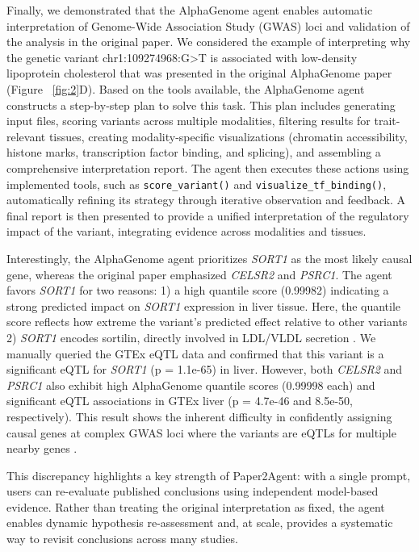 \documentclass[11pt]{article}
\begin{document}
Finally, we demonstrated that the AlphaGenome agent enables automatic interpretation of Genome-Wide Association Study (GWAS) loci and validation of the analysis in the original paper. We considered the example of interpreting why the genetic variant chr1:109274968:G>T is associated with low-density lipoprotein cholesterol that was presented in the original AlphaGenome paper (Figure ~\ref{fig:2}D). Based on the tools available, the AlphaGenome agent constructs a step-by-step plan to solve this task. This plan includes generating input files, scoring variants across multiple modalities, filtering results for trait-relevant tissues, creating modality-specific visualizations (chromatin accessibility, histone marks, transcription factor binding, and splicing), and assembling a comprehensive interpretation report. The agent then executes these actions using implemented tools, such as \texttt{score\_variant()} and \texttt{visualize\_tf\_binding()}, automatically refining its strategy through iterative observation and feedback. A final report is then presented to provide a unified interpretation of the regulatory impact of the variant, integrating evidence across modalities and tissues.

Interestingly, the AlphaGenome agent prioritizes \textit{SORT1} as the most likely causal gene, whereas the original paper emphasized \textit{CELSR2} and \textit{PSRC1}. The agent favors \textit{SORT1} for two reasons: 1) a high quantile score (0.99982) indicating a strong predicted impact on \textit{SORT1} expression in liver tissue. Here, the quantile score reflects how extreme the variant’s predicted effect relative to other variants 2) \textit{SORT1} encodes sortilin, directly involved in LDL/VLDL secretion \citep{kjolby2015sortilin}. We manually queried the GTEx \citep{gtex2020gtex} eQTL data and confirmed that this variant is a significant eQTL for \textit{SORT1} (p = 1.1e-65) in liver. However, both \textit{CELSR2} and \textit{PSRC1} also exhibit high AlphaGenome quantile scores (0.99998 each) and significant eQTL associations in GTEx liver (p =
4.7e-46 and 8.5e-50, respectively).
This result shows the inherent difficulty in confidently assigning causal genes at complex GWAS loci where the variants are eQTLs for multiple nearby genes \citep{wainberg2019opportunities, mostafavi2023systematic}.

This discrepancy highlights a key strength of Paper2Agent: with a single prompt, users can re-evaluate published conclusions using independent model-based evidence. Rather than treating the original interpretation as fixed, the agent enables dynamic hypothesis re-assessment and, at scale, provides a systematic way to revisit conclusions across many studies.
\end{document}
